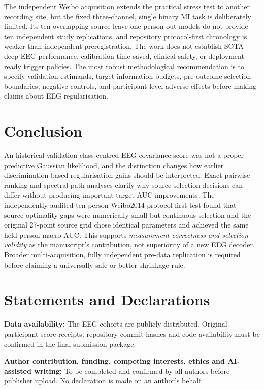 \documentclass[11pt,a4paper]{article}
\begin{document}
The independent Weibo acquisition extends the practical
stress test to another recording site, but the fixed
three-channel, single binary MI task is deliberately
limited. Its ten overlapping-source leave-one-person-out
models do not provide ten independent study replications,
and repository protocol-first chronology is weaker than
independent preregistration. The work does not establish
SOTA deep EEG performance, calibration time saved,
clinical safety, or deployment-ready trigger policies.
The most robust methodological recommendation is to
specify validation estimands, target-information budgets,
pre-outcome selection boundaries, negative controls,
and participant-level adverse effects before making
claims about EEG regularisation.

\section{Conclusion}
An historical validation-class-centred EEG covariance score
was not a proper predictive Gaussian likelihood, and
the distinction changes how earlier discrimination-based
regularisation gains should be interpreted. Exact
pairwise ranking and spectral path analyses clarify why
source selection decisions can differ without producing
important target AUC improvements. The independently
audited ten-person Weibo2014 protocol-first test
found that source-optimality gaps were numerically
small but continuous selection and the original
27-point source grid chose identical parameters and
achieved the same held-person macro AUC.
This supports \emph{measurement correctness and
selection validity} as the manuscript's contribution,
not superiority of a new EEG decoder. Broader
multi-acquisition, fully independent pre-data
replication is required before claiming a universally
safe or better shrinkage rule.

\section*{Statements and Declarations}
\textbf{Data availability:} The EEG cohorts are publicly distributed.
Original participant score receipts, repository commit hashes and code
availability must be confirmed in the final submission package.

\textbf{Author contribution, funding, competing interests, ethics and
AI-assisted writing:} To be completed and confirmed by all authors before
publisher upload. No declaration is made on an author's behalf.



\end{document}

